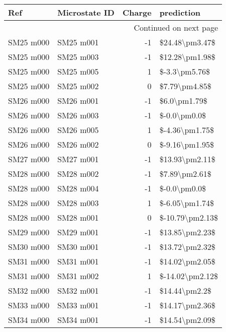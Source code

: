 \begin{longtable}{llrl}
\toprule
       Ref & Microstate ID &  Charge &       prediction \\
\midrule
\endhead
\midrule
\multicolumn{4}{r}{{Continued on next page}} \\
\midrule
\endfoot

\bottomrule
\endlastfoot
 SM25 m000 &     SM25 m001 &      -1 &   \$24.48\textbackslash pm3.47\$ \\
 SM25 m000 &     SM25 m003 &      -1 &   \$12.28\textbackslash pm1.98\$ \\
 SM25 m000 &     SM25 m005 &       1 &    \$-3.3\textbackslash pm5.76\$ \\
 SM25 m000 &     SM25 m002 &       0 &    \$7.79\textbackslash pm4.85\$ \\
 SM26 m000 &     SM26 m001 &      -1 &     \$6.0\textbackslash pm1.79\$ \\
 SM26 m000 &     SM26 m003 &      -1 &     \$-0.0\textbackslash pm0.0\$ \\
 SM26 m000 &     SM26 m005 &       1 &   \$-4.36\textbackslash pm1.75\$ \\
 SM26 m000 &     SM26 m002 &       0 &   \$-9.16\textbackslash pm1.95\$ \\
 SM27 m000 &     SM27 m001 &      -1 &   \$13.93\textbackslash pm2.11\$ \\
 SM28 m000 &     SM28 m002 &      -1 &    \$7.89\textbackslash pm2.61\$ \\
 SM28 m000 &     SM28 m004 &      -1 &     \$-0.0\textbackslash pm0.0\$ \\
 SM28 m000 &     SM28 m003 &       1 &   \$-6.05\textbackslash pm1.74\$ \\
 SM28 m000 &     SM28 m001 &       0 &  \$-10.79\textbackslash pm2.13\$ \\
 SM29 m000 &     SM29 m001 &      -1 &   \$13.85\textbackslash pm2.23\$ \\
 SM30 m000 &     SM30 m001 &      -1 &   \$13.72\textbackslash pm2.32\$ \\
 SM31 m000 &     SM31 m001 &      -1 &   \$14.02\textbackslash pm2.05\$ \\
 SM31 m000 &     SM31 m002 &       1 &  \$-14.02\textbackslash pm2.12\$ \\
 SM32 m000 &     SM32 m001 &      -1 &    \$14.44\textbackslash pm2.2\$ \\
 SM33 m000 &     SM33 m001 &      -1 &   \$14.17\textbackslash pm2.36\$ \\
 SM34 m000 &     SM34 m001 &      -1 &   \$14.54\textbackslash pm2.09\$ \\

\end{longtable}
